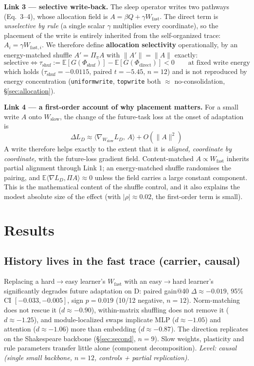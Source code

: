 \documentclass{article} %
\begin{document}
\textbf{Link 3 --- selective write-back.} The sleep operator writes two pathways (Eq.~3--4), whose allocation field is $A = \beta Q + \gamma W_{\mathrm{fast}}$. The direct term is \emph{unselective by rule} (a single scalar $\gamma$ multiplies every coordinate), so the placement of the write is entirely inherited from the self-organized trace: $A_i = \gamma W_{\mathrm{fast},i}$. We therefore define \textbf{allocation selectivity} operationally, by an energy-matched shuffle $A' = \Pi_{\pi} A$ with $\|A'\| = \|A\|$ exactly:
\begin{equation}
\text{selective} \iff \tau_{\mathrm{shuf}} := \mathbb{E}\!\left[G(\Phi_{\mathrm{shuf}})\right] - \mathbb{E}\!\left[G(\Phi_{\mathrm{direct}})\right] < 0\qquad\text{at fixed write energy}
\end{equation}
which holds ($\tau_{\mathrm{shuf}} = -0.0115$, paired $t{=}{-}5.45$, $n{=}12$) and is not reproduced by energy concentration (\texttt{uniformwrite}, \texttt{topwrite} both $\approx$ no-consolidation, \S\ref{sec:allocation}).

\textbf{Link 4 --- a first-order account of why placement matters.} For a small write $A$ onto $W_{\mathrm{slow}}$, the change of the future-task loss at the onset of adaptation is
\begin{equation}
\Delta L_D \approx \langle \nabla_{W_{\mathrm{slow}}} L_D,\, A\rangle + O(\|A\|^2)
\end{equation}
A write therefore helps exactly to the extent that it is \emph{aligned, coordinate by coordinate,} with the future-loss gradient field. Content-matched $A \propto W_{\mathrm{fast}}$ inherits partial alignment through Link 1; an energy-matched shuffle randomises the pairing, and $\mathbb{E}\langle \nabla L_D, \Pi A\rangle \approx 0$ unless the field carries a large constant component. This is the mathematical content of the shuffle control, and it also explains the modest absolute size of the effect (with $|\rho| \approx 0.02$, the first-order term is small).

\section{Results}

\subsection{History lives in the fast trace (carrier, causal)}
\label{sec:carrier}

Replacing a hard$\to$easy learner's $W_{\mathrm{fast}}$ with an easy$\to$hard learner's significantly degrades future adaptation on D: paired gain@40 $\Delta\approx-0.019$, 95\% CI $[-0.033,-0.005]$, sign $p{=}0.019$ (10/12 negative, $n{=}12$). Norm-matching does not rescue it ($d\approx-0.90$), within-matrix shuffling does not remove it ($d\approx-1.25$), and module-localized swaps implicate MLP ($d\approx-1.05$) and attention ($d\approx-1.06$) more than embedding ($d\approx-0.87$). The direction replicates on the Shakespeare backbone (\S\ref{sec:second}, $n{=}9$). Slow weights, plasticity and rule parameters transfer little alone (component decomposition). \emph{Level: causal (single small backbone, $n{=}12$, controls + partial replication).}
\end{document}
